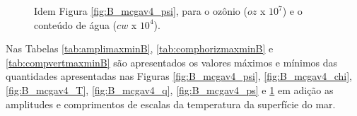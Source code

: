 \begin{figure}[H]
  \vspace{2mm}
    \caption{Idem Figura \ref{fig:B_mcgav4_psi}, para o ozônio ($oz$ x $10^{7}$) e o conteúdo de água ($cw$  x $10^{4}$).}
    \begin{center}
    \end{center}
  \vspace{2mm}
  \legenda{}
  \label{fig:B_mcgav4_oz_cw}
\end{figure}

Nas Tabelas \ref{tab:amplimaxminB}, \ref{tab:comphorizmaxminB} e \ref{tab:compvertmaxminB} são apresentados os valores máximos e mínimos das quantidades apresentadas nas Figuras \ref{fig:B_mcgav4_psi}, \ref{fig:B_mcgav4_chi}, \ref{fig:B_mcgav4_T}, \ref{fig:B_mcgav4_q}, \ref{fig:B_mcgav4_ps} e \ref{fig:B_mcgav4_oz_cw} em adição as amplitudes e comprimentos de escalas da temperatura da superfície do mar.


